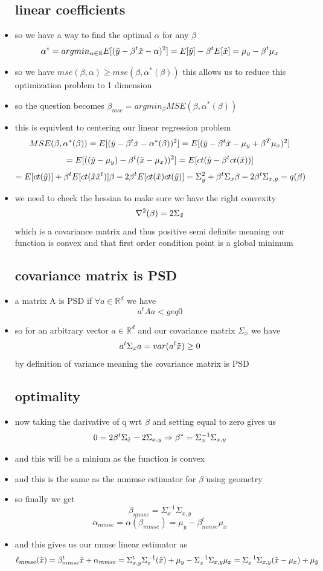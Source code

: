 \documentclass{article}
\begin{document}
\begin{itemize}
\subsection*{linear coefficients}
\item so we have a way to find the optimal $\alpha$ for any $\beta$ $$\alpha^{*}=argmin_{\alpha \in \mathbb{R}}E[(\Tilde{y}-\beta^t\Tilde{x}-\alpha)^2]=E[\Tilde{y}]-\beta^tE[\Tilde{x}]=\mu_{y}-\beta^t\mu_{x}$$
\item so we have $mse(\beta, \alpha)\geq mse(\beta, \alpha^{*}(\beta))$ this allows us to reduce this optimization problem to 1 dimension
\item so the question becomes $\beta_{mse}=argmin_{\beta}MSE(\beta, \alpha^{*}(\beta))$
\item this is equivlent to centering our linear regression problem 
$$MSE(\beta, \alpha^{*}(\beta))=E[(\Tilde{y}-\beta^t\Tilde{x}-\alpha^{*}(\beta))^2]=E[(\Tilde{y}-\beta^t\Tilde{x}-\mu_{y}+\beta^T\mu_{x})^2]$$
$$=E[((\Tilde{y}-\mu_{y})-\beta^t(\Tilde{x}-\mu_{x}))^2]=E[ct(\Tilde{y}-\beta^t ct(\Tilde{x}))]$$
$$=E[ct(\Tilde{y})]+\beta^tE[ct(\Tilde{x}\Tilde{x}^t)]\beta-2\beta^tE[ct(\Tilde{x})ct(\Tilde{y})]=\Sigma^2_{y}+\beta^t\Sigma_{x}\beta - 2\beta^t\Sigma_{x,y}=q(\beta)$$
\item we need to check the hessian to make sure we have the right convexity $$\nabla^2(\beta)=2\Sigma_{\Tilde{x}}$$ 
which is a covariance matrix and thus positive semi definite meaning our function is convex and that first order condition
point is a global minimum 
\subsection*{covariance matrix is PSD}
\item a matrix  A is PSD if $\forall a\in \mathbb{R}^{d} $ we have $$a^tAa<geq 0$$
\item so for an arbitrary vector $a\in \mathbb{R}^d$ and our covariance matrix $\Sigma_{x}$ we have 
$$a^t\Sigma_{x}a=var(a^t\Tilde{x})\geq 0$$ by definition of variance meaning the covariance matrix is PSD 
\subsection*{optimality}
\item now taking the darivative of q wrt $\beta$ and setting equal to zero gives us 
$$0=2 \beta^t\Sigma_{\Tilde{x}}-2\Sigma_{x,y}\Rightarrow \beta^{*}=\Sigma_{x}^{-1}\Sigma_{x,y}$$
\item and this will be a minium as the function is convex 
\item and this is the same as the mmmse estimator for $\beta$ using geometry
\item so finally we get $$\beta_{mmse}=\Sigma_{x}^{-1}\Sigma_{x,y}$$ $$\alpha_{mmse}=\alpha(\beta_{mmse})=\mu_{y}-\beta^t_{mmse}\mu_{x}$$
\item and this gives us our mmse linear estimator as 
$$\ell_{mmse}(\Tilde{x})=\beta_{mmse}^{t}\Tilde{x}+\alpha_{mmse}=\Sigma_{x,y}^{t}\Sigma_{x}^{-1}(\Tilde{x})+\mu_{y}
-\Sigma_{x}^{-1}\Sigma_{x,y}\mu_{x}=\Sigma_{x}^{-1}\Sigma_{x,y}(\Tilde{x}-\mu_{x})+\mu_{\Tilde{y}}
$$


\end{itemize}
\end{document}
